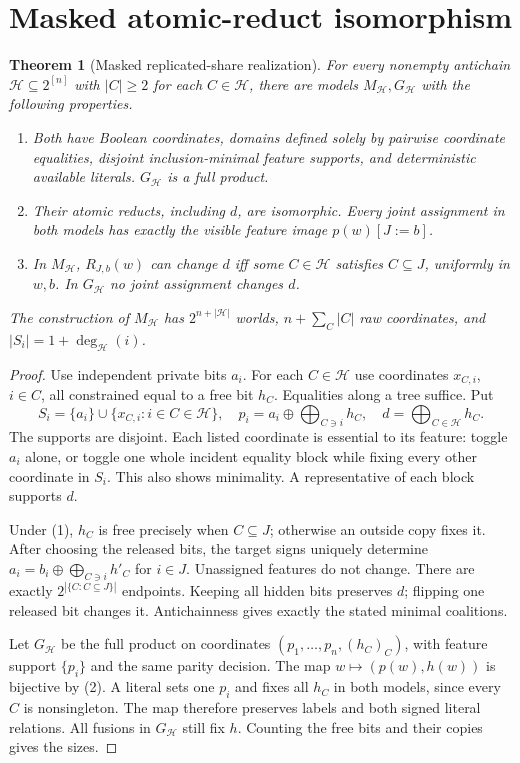 \documentclass[11pt]{article}
\newtheorem{theorem}{Theorem}
\newcommand{\Hh}{\mathcal H}
\newcommand{\xor}{\mathbin\oplus}
\begin{document}
\section{Masked atomic-reduct isomorphism}
\begin{theorem}[Masked replicated-share realization]\label{thm:real}
For every nonempty antichain $\Hh\subseteq 2^{[n]}$ with $|C|\ge2$ for each $C\in\Hh$, there are models $M_{\Hh},G_{\Hh}$ with the following properties.
\begin{enumerate}
\item Both have Boolean coordinates, domains defined solely by pairwise coordinate equalities, disjoint inclusion-minimal feature supports, and deterministic available literals. $G_{\Hh}$ is a full product.
\item Their atomic reducts, including $d$, are isomorphic. Every joint assignment in both models has exactly the visible feature image $p(w)[J:=b]$.
\item In $M_{\Hh}$, $R_{J,b}(w)$ can change $d$ iff some $C\in\Hh$ satisfies $C\subseteq J$, uniformly in $w,b$. In $G_{\Hh}$ no joint assignment changes $d$.
\end{enumerate}
The construction of $M_{\Hh}$ has $2^{n+|\Hh|}$ worlds, $n+\sum_C|C|$ raw coordinates, and $|S_i|=1+\deg_{\Hh}(i)$.
\end{theorem}
\begin{proof}
Use independent private bits $a_i$. For each $C\in\Hh$ use coordinates $x_{C,i}$, $i\in C$, all constrained equal to a free bit $h_C$. Equalities along a tree suffice. Put
\[
 S_i=\{a_i\}\cup\{x_{C,i}:i\in C\in\Hh\},\quad
 p_i=a_i\xor\bigoplus_{C\ni i}h_C,\quad d=\bigoplus_{C\in\Hh}h_C. \tag{2}
\]
The supports are disjoint. Each listed coordinate is essential to its feature: toggle $a_i$ alone, or toggle one whole incident equality block while fixing every other coordinate in $S_i$. This also shows minimality. A representative of each block supports $d$.

Under (1), $h_C$ is free precisely when $C\subseteq J$; otherwise an outside copy fixes it. After choosing the released bits, the target signs uniquely determine
$a_i=b_i\xor\bigoplus_{C\ni i}h'_C$ for $i\in J$. Unassigned features do not change. There are exactly $2^{|\{C:C\subseteq J\}|}$ endpoints. Keeping all hidden bits preserves $d$; flipping one released bit changes it. Antichainness gives exactly the stated minimal coalitions.

Let $G_{\Hh}$ be the full product on coordinates $(p_1,\ldots,p_n,(h_C)_C)$, with feature support $\{p_i\}$ and the same parity decision. The map $w\mapsto(p(w),h(w))$ is bijective by (2). A literal sets one $p_i$ and fixes all $h_C$ in both models, since every $C$ is nonsingleton. The map therefore preserves labels and both signed literal relations. All fusions in $G_{\Hh}$ still fix $h$. Counting the free bits and their copies gives the sizes.
\end{proof}
\end{document}
